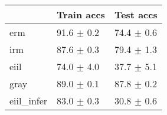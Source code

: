 \begin{tabular}{lll}
\toprule
{} &      Train accs &       Test accs \\
\midrule
erm        &  91.6 $\pm$ 0.2 &  74.4 $\pm$ 0.6 \\
irm        &  87.6 $\pm$ 0.3 &  79.4 $\pm$ 1.3 \\
eiil       &  74.0 $\pm$ 4.0 &  37.7 $\pm$ 5.1 \\
gray       &  89.0 $\pm$ 0.1 &  87.8 $\pm$ 0.2 \\
eiil_infer &  83.0 $\pm$ 0.3 &  30.8 $\pm$ 0.6 \\
\bottomrule
\end{tabular}

